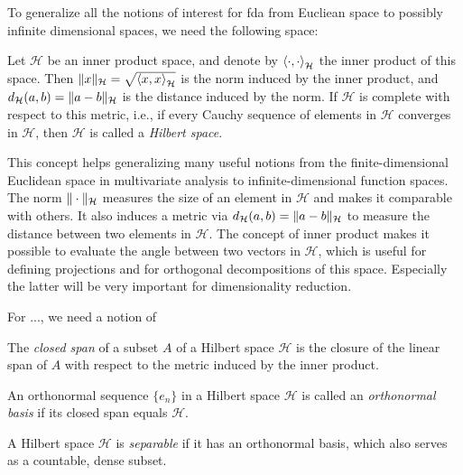 To generalize all the notions of interest for fda from Eucliean space to possibly
infinite dimensional spaces, we need the following space:
\begin{definition}
    \label{def:hilbert space}
    Let $\mathcal{H}$ be an inner product space, and denote by $\left \langle \cdot, \cdot \right \rangle_\mathcal{H}$
    the inner product of this space. Then $\|x\|_\mathcal{H} = \sqrt{\left \langle x, x \right \rangle_\mathcal{H}}$
    is the norm induced by the inner product, and $d_\mathcal{H}(a, b) = \|a - b\|_\mathcal{H}$
    is the distance induced by the norm. If $\mathcal{H}$ is complete with respect
    to this metric, i.e., if every Cauchy sequence of elements in $\mathcal{H}$ converges
    in $\mathcal{H}$, then $\mathcal{H}$ is called a \textit{Hilbert space}.
\end{definition}
This concept helps generalizing many useful notions from the finite-dimensional
Euclidean space in multivariate analysis to infinite-dimensional function spaces. The norm
$\|\cdot\|_\mathcal{H}$ measures the size of an element in $\mathcal{H}$ and makes it
comparable with others. It also induces a metric via
$d_\mathcal{H}(a, b) = \|a - b\|_\mathcal{H}$ to measure the distance between two
elements in $\mathcal{H}$. The concept of inner product makes it possible to evaluate
the angle between two vectors in $\mathcal{H}$, which is useful for defining projections
and for orthogonal decompositions of this space. Especially the latter will be very
important for dimensionality reduction.

For ..., we need a notion of 
\begin{definition}
    \label{def:closed span}
    The \textit{closed span} of a subset \( A \) of a Hilbert space \( \mathcal{H} \) is the 
    closure of the linear span of \( A \) with respect to the metric induced by the inner product.
\end{definition}

\begin{definition}
    An orthonormal sequence \( \{ e_n \} \) in a Hilbert space \( \mathcal{H} \) is called 
    an \textit{orthonormal basis} if its closed span equals \( \mathcal{H} \).
\end{definition}

\begin{definition}
    A Hilbert space \( \mathcal{H} \) is \textit{separable} if it has an orthonormal basis, 
    which also serves as a countable, dense subset.
\end{definition}

